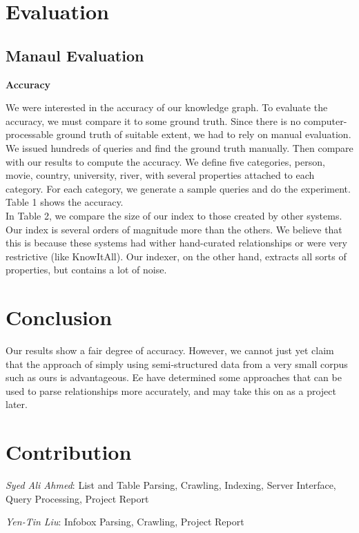 \documentclass[11pt,twocolumn]{article}
\begin{document}
\section{Evaluation}

\subsection{Manaul Evaluation}

{\bf Accuracy}

We were interested in the accuracy of our knowledge graph. To evaluate the accuracy, we must compare it to some ground truth. Since there is no computer-processable ground truth of suitable extent, we had to rely on manual evaluation. We issued hundreds of queries and find the ground truth manually. Then compare with our results to compute the accuracy. We define five categories, {person, movie, country, university, river}, with several properties attached to each category. For each category, we generate a sample queries and do the experiment. Table 1 shows the accuracy.\\

In Table 2, we compare the size of our index to those created by other systems. Our index is several orders of magnitude more than the others. We believe that this is because these systems had wither hand-curated relationships or were very restrictive (like KnowItAll). Our indexer, on the other hand, extracts all sorts of properties, but contains a lot of noise.

\section{Conclusion} 
Our results show a fair degree of accuracy. However, we cannot just yet claim that the approach of simply using semi-structured data from a very small corpus such as ours is advantageous. Ee have determined some approaches that can be used to parse relationships more accurately, and may take this on as a project later. \\

\section{Contribution}


\emph{Syed Ali Ahmed}: List and Table Parsing, Crawling, Indexing, Server Interface, Query Processing, Project Report

\emph{Yen-Tin Liu}: Infobox Parsing, Crawling, Project Report 
\end{document}
